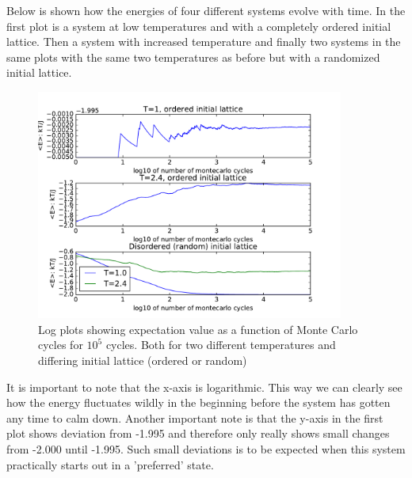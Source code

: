 \documentclass[a4paper, 12pt]{article}
\begin{document}
{	Below is shown how the energies of four different systems evolve with time. In the first plot is a system at low temperatures and with a completely ordered initial lattice. Then a system with increased temperature and finally two systems in the same plots with the same two temperatures as before but with a randomized initial lattice.
	\begin{figure}[H]
	\begin{center}
		\includegraphics[width=0.9\textwidth]{4c.pdf}
		\caption{Log plots showing expectation value as a function of Monte Carlo cycles for $10^5$ cycles. Both for two different temperatures and differing initial lattice (ordered or random)}
	\end{center}
	\end{figure}
	It is important to note that the x-axis is logarithmic. This way we can clearly see how the energy fluctuates wildly in the beginning before the system has gotten any time to calm down. Another important note is that the y-axis in the first plot shows deviation from -1.995 and therefore only really shows small changes from -2.000 until -1.995. Such small deviations is to be expected when this system practically starts out in a 'preferred' state.

	\newpage
}
\end{document}
